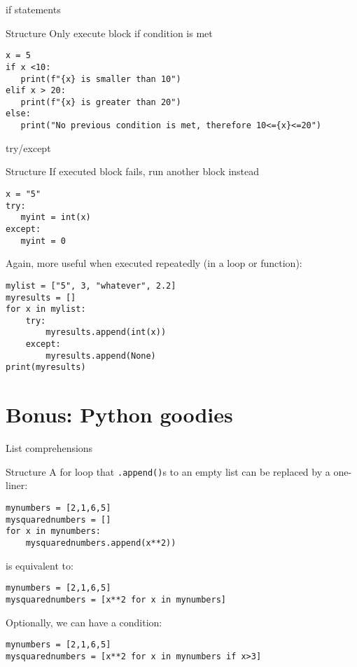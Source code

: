 \begin{frame}[fragile]{if statements}
	\begin{block}{Structure}
		Only execute block if condition is met
	\end{block}
	\begin{verbatim}
x = 5
if x <10:
   print(f"{x} is smaller than 10")
elif x > 20:
   print(f"{x} is greater than 20")
else:
   print("No previous condition is met, therefore 10<={x}<=20")
\end{verbatim}

\end{frame}





\begin{frame}[fragile]{try/except}
\begin{block}{Structure}
If executed block fails, run another block instead
\end{block}
\begin{verbatim}
x = "5"
try: 
   myint = int(x)
except:
   myint = 0
\end{verbatim}

\pause 
\small{Again, more useful when executed repeatedly (in a loop or function):}
\begin{verbatim}
mylist = ["5", 3, "whatever", 2.2]
myresults = []
for x in mylist:
    try: 
        myresults.append(int(x))
    except:
        myresults.append(None)
print(myresults)
\end{verbatim}
\end{frame}





\section[Bonus]{Bonus: Python goodies}

\begin{frame}[fragile]{List comprehensions}
\begin{block}{Structure}
A for loop that \texttt{.append()}s to an empty list can be replaced by a one-liner:
\end{block}
\begin{verbatim}
mynumbers = [2,1,6,5]
mysquarednumbers = []
for x in mynumbers:
    mysquarednumbers.append(x**2))
\end{verbatim}
is equivalent to:
\begin{verbatim}
mynumbers = [2,1,6,5]
mysquarednumbers = [x**2 for x in mynumbers]
\end{verbatim}

\pause 
Optionally, we can have a condition:
\begin{verbatim}
mynumbers = [2,1,6,5]
mysquarednumbers = [x**2 for x in mynumbers if x>3]
\end{verbatim}

\end{frame}




